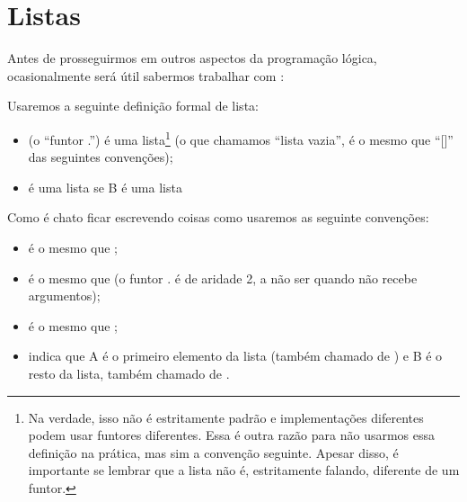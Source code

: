 


\renewcommand\refname{Leituras Adicionais\\ \vspace{3mm} \normalsize{} \normalfont
  \\ A pesquisa e prática em programação lógica frequentemente é muito próxima à de linguagens funcionais e esse é o caso na área de transformações de programas. As transformações de \technical {folding/unfolding} foram primeiro adaptadas para a programação lógica por Tamaki e Sato \cite{tamaki}. Mais informações podem ser encontradas em \cite{ramakrishnan}. }


%
%
%



\section{Listas}

Antes de prosseguirmos em outros aspectos da programação lógica, ocasionalmente será útil sabermos trabalhar com :

\begin{definition}
  Usaremos a seguinte definição formal de lista:
  \begin{itemize}
    \item {} (o ``funtor .'') é uma lista\footnote{Na verdade, isso não é estritamente padrão e implementações diferentes podem usar funtores diferentes. Essa é outra razão para não usarmos essa definição na prática, mas sim a convenção seguinte. Apesar disso, é importante se lembrar que a lista não é, estritamente falando, diferente de um funtor.} (o que chamamos ``lista vazia'', é o mesmo que ``[]'' das seguintes convenções);
    \item {} é uma lista se B é uma lista
  \end{itemize}
  Como é chato ficar escrevendo coisas como  usaremos as seguinte convenções:
  \begin{itemize}
    \item \codigo{[A,B]} é o mesmo que ;
    \item \codigo{[A]} é o mesmo que  (o funtor . é de aridade 2, a não ser quando não recebe argumentos);
    \item \codigo{[A, B, C, ...]} é o mesmo que ;
    \item \codigo{[A|B]} indica que A é o primeiro elemento da lista (também chamado de ) e B é o resto da lista, também chamado de  .
  \end{itemize}
\end{definition}

